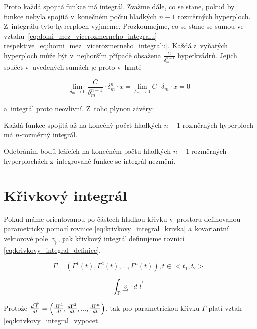 Proto každá spojitá funkce má integrál. Zvažme dále, co se stane, pokud by funkce nebyla spojitá v~konečném počtu hladkých \(n-1\) rozměrných hyperploch. Z~integrálu tyto hyperploch vyjmeme. Prozkoumejme, co se stane se sumou ve vztahu~\eqref{eq:dolni_mez_vicerozmerneho_integralu} respektive~\eqref{eq:horni_mez_vicerozmerneho_integralu}. Každá z~vyňatých hyperploch může být v~nejhorším případě obsažena \(\frac{C}{\delta_m^{n-1}}\) hyperkvádrů. Jejich součet v~uvedených sumách je proto v~limitě

\begin{equation}
\lim_{\delta_m \to 0} \frac{C}{\delta_m^{n-1}} \cdot \delta_m^n \cdot x = \lim_{\delta_m \to 0} C \cdot \delta_m \cdot x = 0 
\end{equation}

a~integrál proto neovlivní. Z~toho plynou závěry:

\begin{fact}
Každá funkce spojitá až na konečný počet hladkých \(n-1\) rozměrných hyperploch má \(n\)-rozměrný integrál.
\end{fact}

\begin{fact}
Odebráním bodů ležících na konečném počtu hladkých \(n-1\) rozměrných hyperplochách z~integrované funkce se integrál nezmění.
\end{fact}


\section{Křivkový integrál}

Pokud máme orientovanou po částech hladkou křivku v~prostoru definovanou parametricky pomocí rovnice \eqref{eq:krivkovy_integral_krivka} a~kovariantní vektorové pole \(\underrightarrow{v}\), pak křivkový integrál definujeme rovnicí \eqref{eq:krivkovy_integral_definice}.

\begin{equation}
\label{eq:krivkovy_integral_krivka}
\Gamma = (\Gamma^1(t), \Gamma^2(t), ..., \Gamma^n(t)), t \in <t_1, t_2>
\end{equation}

\begin{equation}
\label{eq:krivkovy_integral_definice}
\begin{split}
\int_\Gamma \underrightarrow{v} \cdot d\overrightarrow{l}
\end{split}
\end{equation}

Protože \(\frac{d\overrightarrow{l}}{dt} = \left(\frac{d \Gamma^1}{dt}, \frac{d \Gamma^2}{dt}, ..., \frac{d \Gamma^n}{dt} \right)\), tak pro parametrickou křivku
\(\Gamma\) platí vztah \eqref{eq:krivkovy_integral_vypocet}.

